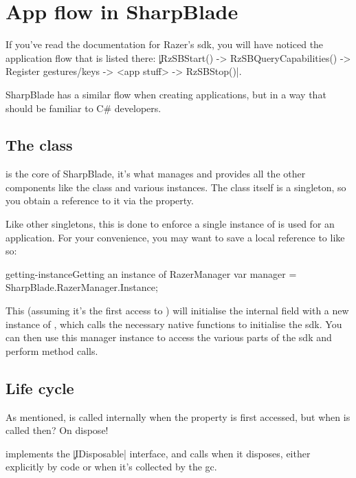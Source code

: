 \chapter{App flow in SharpBlade}
If you've read the documentation for Razer's \gls{sdk}, you will have noticed the application flow that is listed there: \c|RzSBStart() -> RzSBQueryCapabilities() -> Register gestures/keys -> <app stuff> -> RzSBStop()|.

SharpBlade has a similar flow when creating applications, but in a way that should be familiar to C\# developers.

\section[The RazerManager class]{The  class}
 is the core of SharpBlade, it's what manages and provides all the other components like the  class and various  instances. The class itself is a singleton, so you obtain a reference to it via the  property.

Like other singletons, this is done to enforce a single instance of  is used for an application. For your convenience, you may want to save a local reference to  like so:

\begin{csexample}{getting-instance}{Getting an instance of RazerManager}
    var manager = SharpBlade.RazerManager.Instance;
\end{csexample}

This (assuming it's the first access to ) will initialise the internal field with a new instance of , which calls the necessary native functions to initialise the \gls{sdk}. You can then use this manager instance to access the various parts of the \gls{sdk} and perform method calls.

\section{Life cycle}
As mentioned,  is called internally when the  property is first accessed, but when is  called then? On dispose!

 implements the \c|IDisposable| interface, and calls  when it disposes, either explicitly by code or when it's collected by the \gls{gc}.
